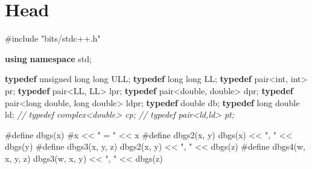 \documentclass[
]{article}
\author{}
\date{}
\newenvironment{Shaded}{}{}
\newcommand{\CommentTok}[1]{\textcolor[rgb]{0.38,0.63,0.69}{\textit{#1}}}
\newcommand{\DataTypeTok}[1]{\textcolor[rgb]{0.56,0.13,0.00}{#1}}
\newcommand{\ImportTok}[1]{#1}
\newcommand{\KeywordTok}[1]{\textcolor[rgb]{0.00,0.44,0.13}{\textbf{#1}}}
\newcommand{\NormalTok}[1]{#1}
\newcommand{\PreprocessorTok}[1]{\textcolor[rgb]{0.74,0.48,0.00}{#1}}
\newcommand{\StringTok}[1]{\textcolor[rgb]{0.25,0.44,0.63}{#1}}
\begin{document}
\hypertarget{head}{%
\section{Head}\label{head}}

\begin{Shaded}
\begin{Highlighting}[]
\PreprocessorTok{\#include }\ImportTok{"bits/stdc++.h"}
 
\KeywordTok{using} \KeywordTok{namespace}\NormalTok{ std;}
   
\KeywordTok{typedef} \DataTypeTok{unsigned} \DataTypeTok{long} \DataTypeTok{long}\NormalTok{ ULL;}
\KeywordTok{typedef} \DataTypeTok{long} \DataTypeTok{long}\NormalTok{ LL;}
\KeywordTok{typedef}\NormalTok{ pair\textless{}}\DataTypeTok{int}\NormalTok{, }\DataTypeTok{int}\NormalTok{\textgreater{} pr;}
\KeywordTok{typedef}\NormalTok{ pair\textless{}LL, LL\textgreater{} lpr;}
\KeywordTok{typedef}\NormalTok{ pair\textless{}}\DataTypeTok{double}\NormalTok{, }\DataTypeTok{double}\NormalTok{\textgreater{} dpr;}
\KeywordTok{typedef}\NormalTok{ pair\textless{}}\DataTypeTok{long} \DataTypeTok{double}\NormalTok{, }\DataTypeTok{long} \DataTypeTok{double}\NormalTok{\textgreater{} ldpr;}
\KeywordTok{typedef} \DataTypeTok{double}\NormalTok{ db;}
\KeywordTok{typedef} \DataTypeTok{long} \DataTypeTok{double}\NormalTok{ ld;}
\CommentTok{// typedef complex\textless{}double\textgreater{} cp;}
\CommentTok{// typedef pair\textless{}ld,ld\textgreater{} pt;}
   
\PreprocessorTok{\#define dbgs}\NormalTok{(x)}\PreprocessorTok{ \#}\NormalTok{x}\PreprocessorTok{ }\NormalTok{\textless{}\textless{}}\PreprocessorTok{ }\StringTok{" = "}\PreprocessorTok{ }\NormalTok{\textless{}\textless{}}\PreprocessorTok{ }\NormalTok{x}
\PreprocessorTok{\#define dbgs2}\NormalTok{(x,}\PreprocessorTok{ }\NormalTok{y)}\PreprocessorTok{ }\NormalTok{dbgs(x)}\PreprocessorTok{ }\NormalTok{\textless{}\textless{}}\PreprocessorTok{ }\StringTok{", "}\PreprocessorTok{ }\NormalTok{\textless{}\textless{}}\PreprocessorTok{ }\NormalTok{dbgs(y)}
\PreprocessorTok{\#define dbgs3}\NormalTok{(x,}\PreprocessorTok{ }\NormalTok{y,}\PreprocessorTok{ }\NormalTok{z)}\PreprocessorTok{ }\NormalTok{dbgs2(x,}\PreprocessorTok{ }\NormalTok{y)}\PreprocessorTok{ }\NormalTok{\textless{}\textless{}}\PreprocessorTok{ }\StringTok{", "}\PreprocessorTok{ }\NormalTok{\textless{}\textless{}}\PreprocessorTok{ }\NormalTok{dbgs(z)}
\PreprocessorTok{\#define dbgs4}\NormalTok{(w,}\PreprocessorTok{ }\NormalTok{x,}\PreprocessorTok{ }\NormalTok{y,}\PreprocessorTok{ }\NormalTok{z)}\PreprocessorTok{ }\NormalTok{dbgs3(w,}\PreprocessorTok{ }\NormalTok{x,}\PreprocessorTok{ }\NormalTok{y)}\PreprocessorTok{ }\NormalTok{\textless{}\textless{}}\PreprocessorTok{ }\StringTok{", "}\PreprocessorTok{ }\NormalTok{\textless{}\textless{}}\PreprocessorTok{ }\NormalTok{dbgs(z)}
  

\end{Highlighting}
\end{Shaded}
\end{document}
